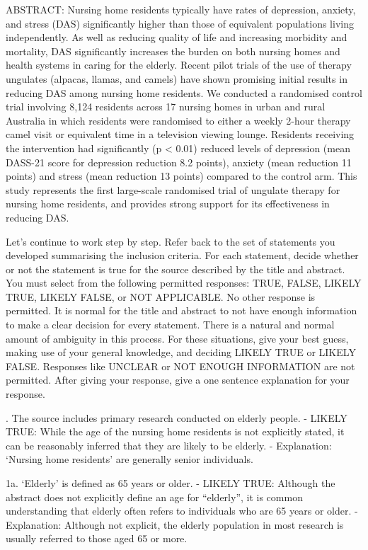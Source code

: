 \documentclass{article}
\begin{document}
\begin{description}
  ABSTRACT: Nursing home residents typically have rates of depression, anxiety,
  and stress (DAS) significantly higher than those of equivalent populations
  living independently. As well as reducing quality of life and increasing
  morbidity and mortality, DAS significantly increases the burden on both
  nursing homes and health systems in caring for the elderly. Recent pilot
  trials of the use of therapy ungulates (alpacas, llamas, and camels) have
  shown promising initial results in reducing DAS among nursing home residents.
  We conducted a randomised control trial involving 8,124 residents across 17
  nursing homes in urban and rural Australia in which residents were randomised
  to either a weekly 2-hour therapy camel visit or equivalent time in a
  television viewing lounge. Residents receiving the intervention had
  significantly (p < 0.01) reduced levels of depression (mean DASS-21 score for
  depression reduction 8.2 points), anxiety (mean reduction 11 points) and
  stress (mean reduction 13 points) compared to the control arm. This study
  represents the first large-scale randomised trial of ungulate therapy for
  nursing home residents, and provides strong support for its effectiveness in
  reducing DAS.

  \System Let's continue to work step by step. Refer back to the set of
  statements you developed summarising the inclusion criteria. For each
  statement, decide whether or not the statement is true for the source
  described by the title and abstract. You must select from the following
  permitted responses: TRUE, FALSE, LIKELY TRUE, LIKELY FALSE, or NOT
  APPLICABLE. No other response is permitted. It is normal for the title and
  abstract to not have enough information to make a clear decision for every
  statement. There is a natural and normal amount of ambiguity in this process.
  For these situations, give your best guess, making use of your general
  knowledge, and deciding LIKELY TRUE or LIKELY FALSE. Responses like UNCLEAR
  or NOT ENOUGH INFORMATION are not permitted. After giving your response, give
  a one sentence explanation for your response.

  . The source includes primary research conducted on elderly people. -
  LIKELY TRUE: While the age of the nursing home residents is not explicitly
  stated, it can be reasonably inferred that they are likely to be elderly. -
  Explanation: `Nursing home residents' are generally senior individuals.

  1a. `Elderly' is defined as 65 years or older. - LIKELY TRUE: Although the
  abstract does not explicitly define an age for ``elderly'', it is common
  understanding that elderly often refers to individuals who are 65 years or
  older. - Explanation: Although not explicit, the elderly population in most
  research is usually referred to those aged 65 or more.


\end{description}
\end{document}
